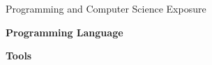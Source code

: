 \documentclass[handout]{beamer}
\begin{document}
\begin{frame}{Programming and Computer Science Exposure}

\textbf{Programming Language}
\vspace{1em}

\begin{minipage}{0.16\textwidth}
	\begin{figure}[t]
		\begin{tikzpicture}[scale=1.0, every node/.style={scale=1.0}]
				
		\end{tikzpicture}
	\end{figure}
\end{minipage}
\vspace{2em}

\textbf{Tools}
\vspace{1em}

\begin{minipage}{0.95\textwidth}
	\begin{figure}[t]	
		\begin{tikzpicture}[scale=0.8, every node/.style={scale=0.8}]
				
		\end{tikzpicture}
	\end{figure}
\end{minipage}



\end{frame}
\end{document}

